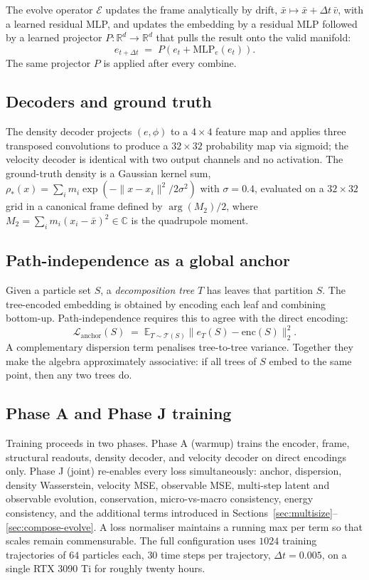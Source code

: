 \documentclass[11pt]{article}
\newcommand{\R}{\mathbb{R}}
\newcommand{\E}{\mathbb{E}}
\newcommand{\enc}{\mathrm{enc}}
\newcommand{\evolve}{\mathcal{E}}
\renewcommand{\frame}{\phi}
\begin{document}
The evolve operator $\evolve$ updates the frame analytically by drift, $\bar{x} \mapsto \bar{x} + \Delta t\, \bar{v}$, with a learned residual MLP, and updates the embedding by a residual MLP followed by a learned projector $P : \R^d \to \R^d$ that pulls the result onto the valid manifold:
\begin{equation}
  e_{t+\Delta t} \;=\; P\!\left(e_t + \mathrm{MLP}_e(e_t)\right).
\end{equation}
The same projector $P$ is applied after every combine.

\subsection{Decoders and ground truth}

The density decoder projects $(e, \frame)$ to a $4 \times 4$ feature map and applies three transposed convolutions to produce a $32 \times 32$ probability map via sigmoid; the velocity decoder is identical with two output channels and no activation. The ground-truth density is a Gaussian kernel sum, $\rho_*(x) = \sum_i m_i \exp(-\|x - x_i\|^2 / 2\sigma^2)$ with $\sigma = 0.4$, evaluated on a $32 \times 32$ grid in a canonical frame defined by $\arg(M_2)/2$, where $M_2 = \sum_i m_i (x_i - \bar{x})^2 \in \mathbb{C}$ is the quadrupole moment.

\subsection{Path-independence as a global anchor}

Given a particle set $S$, a \emph{decomposition tree} $T$ has leaves that partition $S$. The tree-encoded embedding is obtained by encoding each leaf and combining bottom-up. Path-independence requires this to agree with the direct encoding:
\begin{equation}
  \mathcal{L}_{\mathrm{anchor}}(S) \;=\; \E_{T \sim \mathcal{T}(S)} \big\| e_T(S) - \enc(S) \big\|_2^2.
\end{equation}
A complementary dispersion term penalises tree-to-tree variance. Together they make the algebra approximately associative: if all trees of $S$ embed to the same point, then any two trees do.

\subsection{Phase A and Phase J training}

Training proceeds in two phases. Phase A (warmup) trains the encoder, frame, structural readouts, density decoder, and velocity decoder on direct encodings only. Phase J (joint) re-enables every loss simultaneously: anchor, dispersion, density Wasserstein, velocity MSE, observable MSE, multi-step latent and observable evolution, conservation, micro-vs-macro consistency, energy consistency, and the additional terms introduced in Sections~\ref{sec:multisize}--\ref{sec:compose-evolve}. A loss normaliser maintains a running max per term so that scales remain commensurable. The full configuration uses $1024$ training trajectories of $64$ particles each, $30$ time steps per trajectory, $\Delta t = 0.005$, on a single RTX 3090 Ti for roughly twenty hours.
\end{document}
